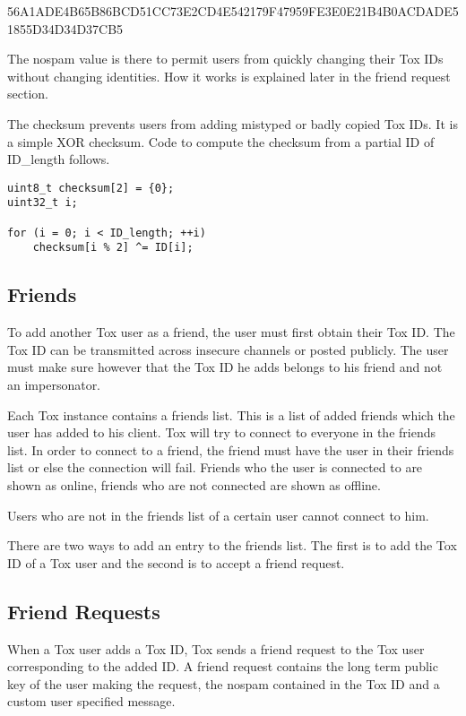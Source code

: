 \documentclass{tox}
\begin{document}
56A1ADE4B65B86BCD51CC73E2CD4E542179F47959FE3E0E21B4B0ACDADE51855D34D34D37CB5

The nospam value is there to permit users from quickly changing their Tox IDs 
without changing identities. How it works is explained later in the friend 
request section.

The checksum prevents users from adding mistyped or badly copied Tox IDs. It is 
a simple XOR checksum. Code to compute the checksum from a partial ID of 
ID\_length follows.

\begin{lstlisting}
uint8_t checksum[2] = {0};
uint32_t i;

for (i = 0; i < ID_length; ++i)
    checksum[i % 2] ^= ID[i];

\end{lstlisting}

\subsection{Friends}

To add another Tox user as a friend, the user must first obtain their Tox ID. 
The Tox ID can be transmitted across insecure channels or posted publicly. The 
user must make sure however that the Tox ID he adds belongs to his friend and 
not an impersonator.

Each Tox instance contains a friends list. This is a list of added friends 
which the user has added to his client. Tox will try to connect to everyone in 
the friends list. In order to connect to a friend, the friend must have the 
user in their friends list or else the connection will fail. Friends who the 
user is connected to are shown as online, friends who are not connected are 
shown as offline.

Users who are not in the friends list of a certain user cannot connect to him.

There are two ways to add an entry to the friends list. The first is to add the 
Tox ID of a Tox user and the second is to accept a friend request.

\subsection{Friend Requests}

When a Tox user adds a Tox ID, Tox sends a friend request to the Tox user 
corresponding to the added ID. A friend request contains the long term public 
key of the user making the request, the nospam contained in the Tox ID and a 
custom user specified message.
\end{document}
